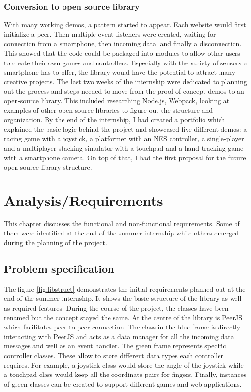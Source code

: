 \documentclass{l4proj}
\begin{document}
\subsection{Conversion to open source library}
With many working demos, a pattern started to appear. Each website would first initialize a peer. Then multiple event listeners were created, waiting for connection from a smartphone, then incoming data, and finally a disconnection. This showed that the code could be packaged into modules to allow other users to create their own games and controllers. Especially with the variety of sensors a smartphone has to offer, the library would have the potential to attract many creative projects. The last two weeks of the internship were dedicated to planning out the process and steps needed to move from the proof of concept demos to an open-source library. This included researching Node.js, Webpack, looking at examples of other open-source libraries to figure out the structure and organization. By the end of the internship, I had created a \href{https://github.com/EmmaPoliakova/WebRTCSmartphoneController}{portfolio} which explained the basic logic behind the project and showcased five different demos: a racing game with a joystick, a platformer with an NES controller, a single-player and a multiplayer stacking simulator with a touchpad and a hand tracking game with a smartphone camera. On top of that, I had the first proposal for the future open-source library structure.

\chapter{Analysis/Requirements}
This chapter discusses the functional and non-functional requirements. Some of them were identified at the end of the summer internship while others emerged during the planning of the project.

\section{Problem specification}
The figure \ref{fig:libstruct} demonstrates the initial requirements planned out at the end of the summer internship. It shows the basic structure of the library as well as required features. During the course of the project, the classes have been renamed but the concept stayed the same. At the centre of the library is PeerJS which facilitates peer-to-peer connection. The class in the blue frame is directly interacting with PeerJS and acts as a data manager for all the incoming data messages and well as an event handler. The green frame represents specific controller classes. These allow to store different data types each controller requires. For example, a joystick class would store the angle of the joystick while a touchpad class would keep all the coordinate pairs for fingers. Finally, instances of green classes can be created to support different games and web applications.
\end{document}
